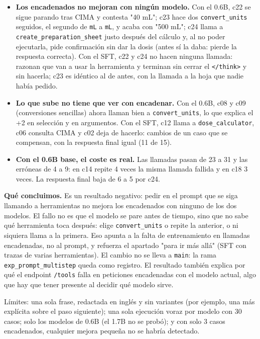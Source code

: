 \begin{itemize}
\tightlist
\item
  \textbf{Los encadenados no mejoran con ningún modelo.} Con el 0.6B, c22 se sigue parando tras CIMA y
  contesta "40 mL"; c23 hace dos \texttt{convert\_\allowbreak{}units} seguidos, el segundo de \texttt{mL} a \texttt{mL}, y acaba con
  "500 mL"; c24 llama a \texttt{create\_\allowbreak{}preparation\_\allowbreak{}sheet} justo después del cálculo y, al no poder
  ejecutarla, pide confirmación sin dar la dosis (antes sí la daba: pierde la respuesta correcta).
  Con el SFT, c22 y c24 no hacen ninguna llamada: razonan que van a usar la herramienta y terminan
  sin cerrar el \texttt{\textless{}/\allowbreak{}think\textgreater{}} y sin hacerla; c23 es idéntico al de antes, con la llamada a la hoja
  que nadie había pedido.
\item
  \textbf{Lo que sube no tiene que ver con encadenar.} Con el 0.6B, c08 y c09 (conversiones sencillas)
  ahora llaman bien a \texttt{convert\_\allowbreak{}units}, lo que explica el +2 en selección y en argumentos. Con el
  SFT, c12 llama a \texttt{dose\_\allowbreak{}calculator}, c06 consulta CIMA y c02 deja de hacerlo: cambios de un caso
  que se compensan, con la respuesta final igual (11 de 15).
\item
  \textbf{Con el 0.6B base, el coste es real.} Las llamadas pasan de 23 a 31 y las erróneas de 4 a 9:
  en c14 repite 4 veces la misma llamada fallida y en c18 3 veces. La respuesta final baja de 6 a 5
  por c24.
\end{itemize}

\textbf{Qué concluimos.} Es un resultado negativo: pedir en el prompt que se siga llamando a herramientas
no mejora los encadenados con ninguno de los dos modelos. El fallo no es que el modelo se pare antes
de tiempo, sino que no sabe qué herramienta toca después: elige \texttt{convert\_\allowbreak{}units} o repite la
anterior, o ni siquiera llama a la primera. Eso apunta a la falta de entrenamiento en llamadas
encadenadas, no al prompt, y refuerza el apartado "para ir más allá" (SFT con trazas de varias
herramientas). El cambio no se lleva a \texttt{main}: la rama \texttt{exp\_\allowbreak{}prompt\_\allowbreak{}multistep} queda como registro.
El resultado también explica por qué el endpoint \texttt{/\allowbreak{}tools} falla en peticiones encadenadas con el
modelo actual, algo que hay que tener presente al decidir qué modelo sirve.

Límites: una sola frase, redactada en inglés y sin variantes (por ejemplo, una más explícita sobre
el paso siguiente); una sola ejecución voraz por modelo con 30 casos; solo los modelos de 0.6B (el
1.7B no se probó); y con solo 3 casos encadenados, cualquier mejora pequeña no se habría detectado.

